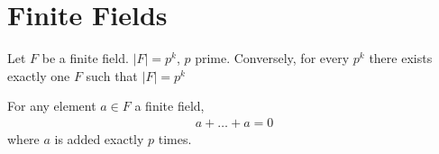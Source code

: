 \documentclass{memoir}
\begin{document}
\section{Finite Fields}
\label{sec:finite_fields}
\begin{thm}
	Let \(F\) be a finite field. \(\left| F \right| = p^{k}\), \(p\) prime. Conversely, for every \(p^{k}\) there exists exactly one \(F\) such that \(\left| F \right| = p^{k}\)
\end{thm}
\begin{thm}
	For any element \(a \in F\) a finite field,
	\begin{align*}
		a + \ldots + a = 0
	\end{align*}
	where \(a\) is added exactly \(p\) times.
\end{thm}
\end{document}
